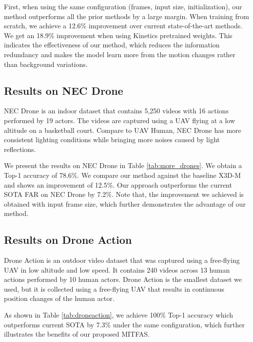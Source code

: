 \documentclass[10pt,twocolumn,letterpaper]{article}
\begin{document}
{First, when using the same configuration (frames, input size, initialization), our method outperforms all the prior methods by a large margin. When training from scratch, we achieve a 12.6\% improvement over current state-of-the-art methods. We get an 18.9\% improvement when using Kinetics pretrained weights. This indicates the effectiveness of our method, which reduces the information redundancy and makes the model learn more from the motion changes rather than background variations.







\subsection{Results on NEC Drone}
NEC Drone is an indoor dataset that contains 5,250 videos with 16 actions performed by 19 actors. The videos are captured using a UAV flying at a low altitude on a basketball court. Compare to UAV Human, NEC Drone has more consistent lighting conditions while bringing more noises caused by light reflections.

We present the results on NEC Drone in Table \ref{tab:more_drones}. We obtain a Top-1 accuracy of 78.6\%. We compare our method against the baseline X3D-M and shows an improvement of 12.5\%. Our approach outperforms the current SOTA FAR on NEC Drone by 7.2\%. Note that, the improvement we achieved is obtained with  input frame size, which further demonstrates the advantage of our method.
\subsection{Results on Drone Action}
Drone Action is an outdoor video dataset that was captured using a free-flying UAV in low altitude and low speed. It contains 240 videos across 13 human actions performed by 10 human actors. Drone Action is the smallest dataset we used, but it is collected using a free-flying UAV that results in continuous position changes of the human actor. 

As shown in Table \ref{tab:droneaction}, we achieve 100\% Top-1 accuracy which outperforms current SOTA by 7.3\% under the same configuration, which further illustrates the benefits of our proposed MITFAS.

}
\end{document}
